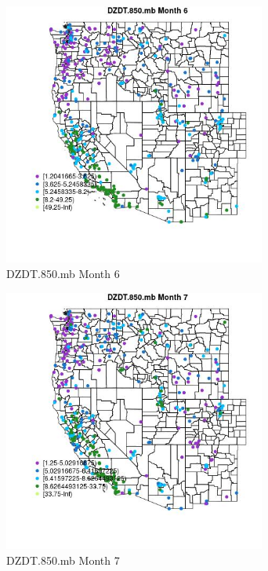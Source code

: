 \begin{figure} 
\centering  
\includegraphics[width=0.77\textwidth]{Code_Outputs/ML_input_report_ML_input_PM25_Step5_part_d_de_duplicated_aves_ML_input_MapObsMo6DZDT850mb.jpg} 
\caption{\label{fig:ML_input_report_ML_input_PM25_Step5_part_d_de_duplicated_aves_ML_inputMapObsMo6DZDT850mb}DZDT.850.mb Month 6} 
\end{figure} 
 

\begin{figure} 
\centering  
\includegraphics[width=0.77\textwidth]{Code_Outputs/ML_input_report_ML_input_PM25_Step5_part_d_de_duplicated_aves_ML_input_MapObsMo7DZDT850mb.jpg} 
\caption{\label{fig:ML_input_report_ML_input_PM25_Step5_part_d_de_duplicated_aves_ML_inputMapObsMo7DZDT850mb}DZDT.850.mb Month 7} 
\end{figure} 
 

